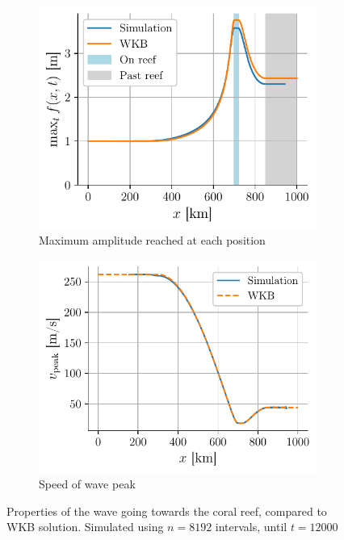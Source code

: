 \begin{figure}[h]
    \centering
    \begin{subfigure}{0.48\linewidth}
        \centering
        \includegraphics[width=\linewidth]{figures/corail_eq1_amplitude_wkb.pdf}
        \caption{Maximum amplitude reached at each position}
        \label{fig:corail_eq1_amplitude}
    \end{subfigure}
    \begin{subfigure}{0.48\linewidth}
        \centering
        \includegraphics[width=\linewidth]{figures/corail_eq1_vitesse_wkb.pdf}
        \caption{Speed of wave peak}
        \label{fig:corail_eq1_vitesse}
    \end{subfigure}
    \caption{Properties of the wave going towards the coral reef, compared to WKB solution. Simulated using \(n=8192\) intervals, until \(t=12000\)}
    \label{fig:corail_eq1_properties}
\end{figure}

